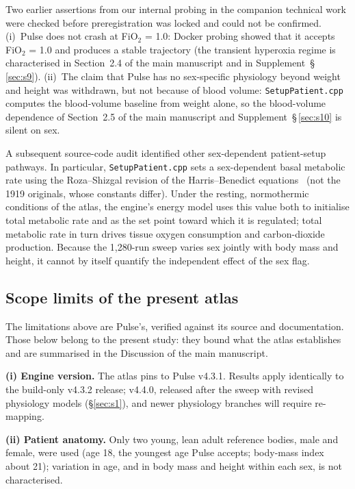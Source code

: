 \documentclass[pdflatex,sn-nature]{sn-jnl}%
\newcommand{\mainref}[2]{#2}
\begin{document}
Two earlier assertions from our internal probing in the companion technical work were checked before preregistration was locked and could not be confirmed. (i)~Pulse does not crash at FiO$_2$ = 1.0: Docker probing showed that it accepts FiO$_2$ = 1.0 and produces a stable trajectory (the transient hyperoxia regime is characterised in Section~\mainref{sec:results-hyperoxia}{2.4} of the main manuscript and in Supplement~\S\,\ref{sec:s9}). (ii)~The claim that Pulse has no sex-specific physiology beyond weight and height was withdrawn, but not because of blood volume: \texttt{SetupPatient.cpp} computes the blood-volume baseline from weight alone, so the blood-volume dependence of Section~\mainref{sec:results-sex}{2.5} of the main manuscript and Supplement~\S\,\ref{sec:s10} is silent on sex.

A subsequent source-code audit identified other sex-dependent patient-setup pathways. In particular, \texttt{SetupPatient.cpp} sets a sex-dependent basal metabolic rate using the Roza--Shizgal revision of the Harris--Benedict equations~\cite{roza1984metabolic} (not the 1919 originals, whose constants differ). Under the resting, normothermic conditions of the atlas, the engine's energy model uses this value both to initialise total metabolic rate and as the set point toward which it is regulated; total metabolic rate in turn drives tissue oxygen consumption and carbon-dioxide production. Because the 1{,}280-run sweep varies sex jointly with body mass and height, it cannot by itself quantify the independent effect of the sex flag.

\subsection{Scope limits of the present atlas}\label{sec:s2-scope}

The limitations above are Pulse's, verified against its source and documentation. Those below belong to the present study: they bound what the atlas establishes and are summarised in the Discussion of the main manuscript.

\textbf{(i) Engine version.} The atlas pins to Pulse v4.3.1. Results apply identically to the build-only v4.3.2 release; v4.4.0, released after the sweep with revised physiology models (\S\ref{sec:s1}), and newer physiology branches will require re-mapping.

\textbf{(ii) Patient anatomy.} Only two young, lean adult reference bodies, male and female, were used (age 18, the youngest age Pulse accepts; body-mass index about 21); variation in age, and in body mass and height within each sex, is not characterised.
\end{document}

